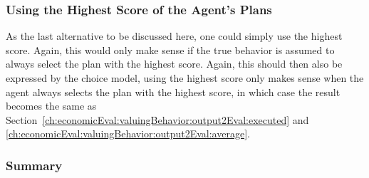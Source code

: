  




\subsubsection{Using the Highest Score of the Agent's Plans}
As the last alternative to be discussed here, one could simply use the highest score.  Again, this would only make sense if the true behavior is assumed to always select the plan with the highest score.  Again, this should then also be expressed by the choice model, \ie using the highest score only makes sense when the agent always selects the plan with the highest score, in which case the result becomes the same as Section~\ref{ch:economicEval:valuingBehavior:output2Eval:executed} and \ref{ch:economicEval:valuingBehavior:output2Eval:average}.

\subsubsection{Summary}
\label{ch:economicEval:valuingBehavior:output2Eval:summary}

